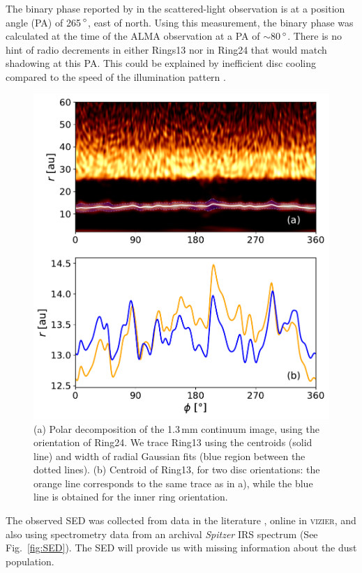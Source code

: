 \documentclass[letters,usenatbib,times]{mnras}
\begin{document}
The binary phase reported by \citet{dOrazi} in the scattered-light observation is at a position angle (PA) of 265\,$\hbox{$^\circ$}$, east of north. Using this measurement, the binary phase was calculated at the time of the ALMA observation at a PA of $\sim$80\,$\hbox{$^\circ$}$. There is no hint of radio decrements in either Rings13 nor in Ring24 that would match shadowing at this PA. This could be explained by inefficient disc cooling compared to the speed of the illumination pattern \citep{Casassus2019MNRAS.486L..58C}. 

\begin{figure}
    \includegraphics[width=\columnwidth]{polar_ring_aprox_and_diff_inner.pdf}
    \caption{(a) Polar decomposition of the 1.3\,mm continuum image, using the orientation of Ring24. We trace Ring13 using the centroids (solid line) and width of radial Gaussian fits (blue region between the dotted lines). (b) Centroid of Ring13, for two disc orientations: the orange line corresponds to the same trace as in a), while the blue line is obtained for the inner ring orientation.}
    \label{fig:polarring}
\end{figure}

The observed SED was collected from data in the literature \citep{1988iras....7.....H, 1990A&A...234..230H, Jensen_97, 2000A&A...355L..27H, 2001KFNT...17..409K, 2003yCat.2246....0C, 2007PASJ...59S.369M, 2008PASP..120.1128O, 2010A&A...514A...1I, 2012yCat.2311....0C}, online in \textsc{vizier}, and also using spectrometry data from an archival \textit{Spitzer} IRS spectrum (See Fig.~\ref{fig:SED}). The SED will provide us with missing information about the dust population.
\end{document}
